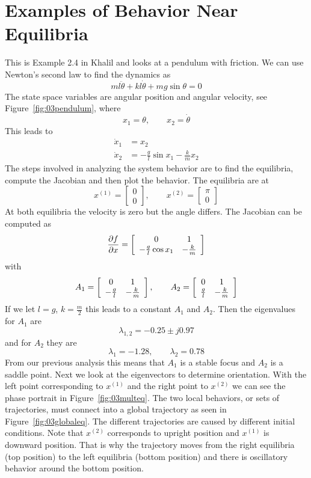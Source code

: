 \section{Examples of Behavior Near Equilibria}
\begin{example}
\label{ex:03pendulum}
This is Example 2.4 in Khalil and looks at a pendulum with friction.
We can use Newton's second law to find the dynamics as
$$ml\ddot{\theta} + kl\dot{\theta} + mg\sin\theta = 0$$
The state space variables are angular position and angular velocity, see Figure~\ref{fig:03pendulum}, where
$$ x_1 = \theta, \qquad x_2 = \dot{\theta}$$
This leads to
\begin{align*}
\dot{x}_1 &= x_2 \\
\dot{x}_2 &= -\tfrac{g}{l}\sin x_1 - \tfrac{k}{m}x_2
\end{align*}
The steps involved in analyzing the system behavior are to find the equilibria, compute the Jacobian and then plot the behavior.
The equilibria are at
$$x^{(1)} = \left[\begin{array}{c} 0 \\ 0 \end{array}\right], \qquad x^{(2)} = \left[\begin{array}{c} \pi \\ 0 \end{array}\right]$$
At both equilibria the velocity is zero but the angle differs.
The Jacobian can be computed as
$$\frac{\partial{} f}{\partial{} x} = \left[\begin{array}{c c} 0 & 1 \\ -\tfrac{g}{l}\cos x_1 & -\tfrac{k}{m} \end{array}\right]$$
with
$$A_1 = \left[\begin{array}{c c} 0 & 1 \\ -\tfrac{g}{l} & -\tfrac{k}{m} \end{array}\right], \qquad A_2 = \left[\begin{array}{c c} 0 & 1 \\ \tfrac{g}{l} & -\tfrac{k}{m} \end{array}\right]$$
If we let $l=g$, $k=\tfrac{m}{2}$ this leads to a constant $A_1$ and $A_2$.
Then the eigenvalues for $A_1$ are
$$\lambda_{1,2} = -0.25\pm{} j0.97$$
and for $A_2$ they are
$$\lambda_1 = -1.28, \qquad \lambda_2 = 0.78$$
From our previous analysis this means that $A_1$ is a stable focus and $A_2$ is a saddle point.
Next we look at the eigenvectors to determine orientation.
With the left point corresponding to $x^{(1)}$ and the right point to $x^{(2)}$ we can see the phase portrait in Figure~\ref{fig:03multeq}.
The two local behaviors, or sets of trajectories, must connect into a global trajectory as seen in Figure~\ref{fig:03globaleq}.
The different trajectories are caused by different initial conditions.
Note that $x^{(2)}$ corresponds to upright position and $x^{(1)}$ is downward position.
That is why the trajectory moves from the right equilibria (top position) to the left equilibria (bottom position) and there is oscillatory behavior around the bottom position.


\end{example}
